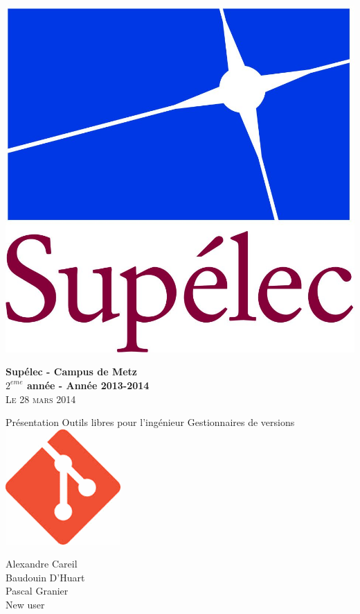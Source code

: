 \begin{minipage}{1\textwidth}
  \centering 

  \begin{flushleft}
    \includegraphics[scale=0.3]{LogoSup.jpg}
    \newline

    \textbf{Supélec - Campus de Metz\\
      $2^{eme}$ année - Année 2013-2014}\\
    \textsc{Le 28 mars 2014}
  \end{flushleft}
  
  \vskip 5cm
  {\LARGE\textsc Présentation Outils libres pour l'ingénieur}
  \vskip 0.5cm
  {\LARGE\textsc Gestionnaires de versions}
  \vskip 3cm
  \includegraphics[scale=0.5]{images/git.png}
  \vskip 4cm

  \Large{Alexandre Careil\\
  Baudouin D'Huart\\
Pascal Granier\\
New user}
\end{minipage}
